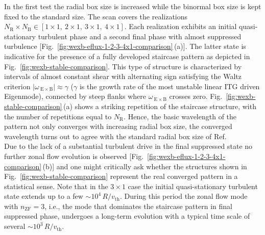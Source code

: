 \documentclass[aip, amsmath, amssymb, reprint, twocolumn, floatfix]{revtex4-1}
\newcommand{\wexb}{\omega_{\mathrm{\:E \times B}}}
\newcommand{\NR}{N_\mathrm{R}}
\newcommand{\NB}{N_\mathrm{B}}
\newcommand{\vth}{v_{\mathrm{th}}}
\newcommand{\nzf}{n_\mathrm{ZF}}
\begin{document}
In the first test the radial box size is increased while the binormal box size is kept fixed to the standard size. The scan covers the realizations $\NR\times\NB \in [ 1\times1,~2\times1,~3\times1,~4\times1]$.
Each realization exhibits an initial quasi-stationary turbulent phase and a second final \cite{peeters2016} phase with almost suppressed turbulence [Fig.~\ref{fig:wexb-eflux-1-2-3-4x1-comparison}\,(a)].
The latter state is indicative for the presence of a fully developed staircase pattern as depicted in Fig.~\ref{fig:wexb-stable-comparison}. 
This type of structure is characterized by intervals of almost constant shear with alternating sign satisfying the Waltz criterion $|\wexb| \approx \gamma$\cite{doi:10.1063/1.870934, doi:10.1063/1.872847} ($\gamma$ is the growth rate of the most unstable linear ITG driven Eigenmode), connected by steep flanks where $\wexb$ crosses zero.
Fig.~\ref{fig:wexb-stable-comparison}\,(a) shows a striking repetition of the staircase structure, with the number of repetitions equal to $\NR$.
Hence, the basic wavelength of the pattern not only converges with increasing radial box size, the converged wavelength turns out to agree with the standard radial box size of Ref.~\cite{peeters2016} \\
Due to the lack of a substantial turbulent drive in the final suppressed state no further zonal flow evolution is observed [Fig.~\ref{fig:wexb-eflux-1-2-3-4x1-comparison}\,(b)] and one might critically ask whether the structures shown in Fig.~\ref{fig:wexb-stable-comparison} represent the real converged pattern in a statistical sense. 
Note that in the $3 \times 1$ case the initial quasi-stationary turbulent state extends up to a few $\sim 10^4\,R/\vth$.
During this period the zonal flow mode with $\nzf = 3$, i.e., the mode that dominates the staircase pattern in final suppressed phase, undergoes a long-term evolution with a typical time scale of several $\sim 10^3\,R/\vth$. 
\end{document}
